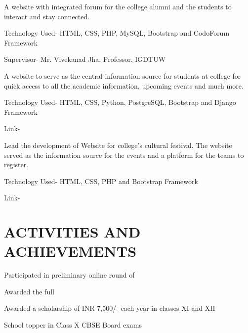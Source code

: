 \documentclass[]{resume-openfont}
\begin{document}
\begin{minipage}[t]{0.66\textwidth}
A website with integrated forum for the college alumni and the students to interact and stay connected.
\begin{tightemize}
\item Technology Used- HTML, CSS, PHP, MySQL, Bootstrap and CodoForum Framework
\item Supervisor- Mr. Vivekanad Jha, Professor, IGDTUW
\end{tightemize}
\sectionsep

A website to serve as the central information source for students at college for quick access to all the academic information, upcoming events and much more.
\begin{tightemize}
\item Technology Used- HTML, CSS, Python, PostgreSQL, Bootstrap and Django
Framework
\item Link- \href{http://igdtuwonline.herokuapp.com/}{}
\end{tightemize}
\sectionsep

Lead the development of Website for college’s cultural festival. The website served as the information source for the events and a platform for the teams to register. 
\begin{tightemize}
\item Technology Used- HTML, CSS, PHP and Bootstrap Framework
\item Link- \href{http://www.taarangana.com/}{}
\end{tightemize}

\sectionsep


\section{ACTIVITIES AND ACHIEVEMENTS}

\begin{tightemize}
\item {}
\item Participated in preliminary online round of 
\item Awarded the full 
\item Awarded a scholarship of INR 7,500/-  each year in classes XI and XII
\item School topper in Class X CBSE Board exams
\end{tightemize}
\sectionsep


\end{minipage}
\end{document}
